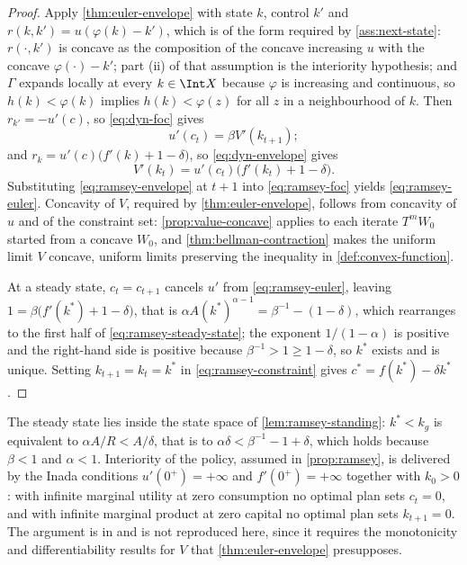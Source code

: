 \begin{proof}
	Apply \autoref{thm:euler-envelope} with state $k$, control $k'$ and
	$r(k,k')=u(\varphi(k)-k')$, which is of the form required by
	\autoref{ass:next-state}: $r(\cdot,k')$ is concave as the composition of the
	concave increasing $u$ with the concave $\varphi(\cdot)-k'$; part (ii) of that
	assumption is the interiority hypothesis; and $\Gamma$ expands locally at
	every $k\in\Int X$ because $\varphi$ is increasing and continuous, so
	$h(k)<\varphi(k)$ implies $h(k)<\varphi(z)$ for all $z$ in a neighbourhood
	of $k$. Then
	$r_{k'}=-u'(c)$, so \eqref{eq:dyn-foc} gives
	\begin{equation}\label{eq:ramsey-foc}
		u'(c_t)=\beta V'(k_{t+1});
	\end{equation}
	and $r_k=u'(c)\bigl(f'(k)+1-\delta\bigr)$, so
	\eqref{eq:dyn-envelope} gives
	\begin{equation}\label{eq:ramsey-envelope}
		V'(k_t)=u'(c_t)\bigl(f'(k_t)+1-\delta\bigr).
	\end{equation}
	Substituting \eqref{eq:ramsey-envelope} at $t+1$ into \eqref{eq:ramsey-foc}
	yields \eqref{eq:ramsey-euler}. Concavity of $V$, required by
	\autoref{thm:euler-envelope}, follows from concavity of $u$ and of the
	constraint set: \autoref{prop:value-concave} applies to each iterate $T^{m}W_0$
	started from a concave $W_0$, and \autoref{thm:bellman-contraction} makes the
	uniform limit $V$ concave, uniform limits preserving the inequality in
	\autoref{def:convex-function}.

	At a steady state, $c_t=c_{t+1}$ cancels $u'$ from \eqref{eq:ramsey-euler},
	leaving $1=\beta\bigl(f'(k^{\ast})+1-\delta\bigr)$, that is
	$\alpha A(k^{\ast})^{\alpha-1}=\beta^{-1}-(1-\delta)$, which rearranges to the
	first half of \eqref{eq:ramsey-steady-state}; the exponent
	$1/(1-\alpha)$ is positive and the right-hand side is positive because
	$\beta^{-1}>1\geq1-\delta$, so $k^{\ast}$ exists and is unique. Setting
	$k_{t+1}=k_t=k^{\ast}$ in \eqref{eq:ramsey-constraint} gives
	$c^{\ast}=f(k^{\ast})-\delta k^{\ast}$.
\end{proof}

The steady state lies inside the state space of \autoref{lem:ramsey-standing}:
$k^{\ast}<k_{g}$ is equivalent to $\alpha A/R<A/\delta$, that is to
$\alpha\delta<\beta^{-1}-1+\delta$, which holds because $\beta<1$ and
$\alpha<1$. Interiority of the policy, assumed in \autoref{prop:ramsey}, is
delivered by the Inada conditions $u'(0^{+})=+\infty$ and $f'(0^{+})=+\infty$
together with $k_0>0$: with infinite marginal utility at zero consumption no
optimal plan sets $c_t=0$, and with infinite marginal product at zero capital no
optimal plan sets $k_{t+1}=0$. The argument is in
\textcite[Ch.~5]{stokey1989recursive} and is not reproduced here, since it
requires the monotonicity and differentiability results for $V$ that
\autoref{thm:euler-envelope} presupposes.

